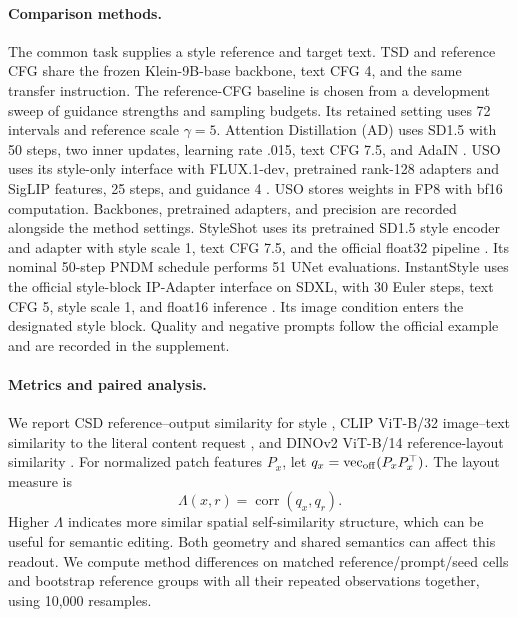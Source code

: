 \paragraph{Comparison methods.}
The common task supplies a style reference and target text. TSD and
reference CFG share the frozen Klein-9B-base backbone, text CFG 4, and the
same transfer instruction. The reference-CFG baseline is chosen from a
development sweep of guidance strengths and sampling budgets. Its retained
setting uses 72 intervals and reference scale $\gamma=5$.
Attention Distillation (AD) uses SD1.5 with 50 steps, two inner updates,
learning rate .015, text CFG 7.5, and AdaIN
\citep{zhou2025attentiondistillation}. USO uses its style-only interface
with FLUX.1-dev, pretrained rank-128 adapters and SigLIP features, 25 steps,
and guidance 4 \citep{wu2025uso}. USO stores weights in FP8 with bf16
computation. Backbones, pretrained adapters, and precision are recorded
alongside the method settings. StyleShot uses its pretrained SD1.5
style encoder and adapter with style scale 1, text CFG 7.5, and the official
float32 pipeline \citep{gao2024styleshot}. Its nominal 50-step PNDM schedule
performs 51 UNet evaluations. InstantStyle uses the official style-block
IP-Adapter interface on SDXL, with 30 Euler steps, text CFG 5, style scale
1, and float16 inference \citep{wang2024instantstyle}. Its image condition
enters the designated style block. Quality and negative prompts follow
the official example and are recorded in the supplement.

\paragraph{Metrics and paired analysis.}
We report CSD reference--output similarity for style
\citep{somepalli2024csd}, CLIP ViT-B/32 image--text similarity to the literal
content request \citep{radford2021clip}, and DINOv2 ViT-B/14 reference-layout
similarity \citep{oquab2024dinov2}. For normalized patch features $P_x$,
let $q_x=\operatorname{vec}_{\rm off}(P_xP_x^\top)$. The layout measure is
\begin{equation}
\Lambda(x,r)=\operatorname{corr}(q_x,q_r).
\label{eq:layout}
\end{equation}
Higher $\Lambda$ indicates more similar spatial self-similarity structure,
which can be useful for semantic editing. Both geometry and shared
semantics can affect this readout. We compute method differences on matched
reference/prompt/seed cells and bootstrap reference groups with all their
repeated observations together, using 10,000 resamples.

